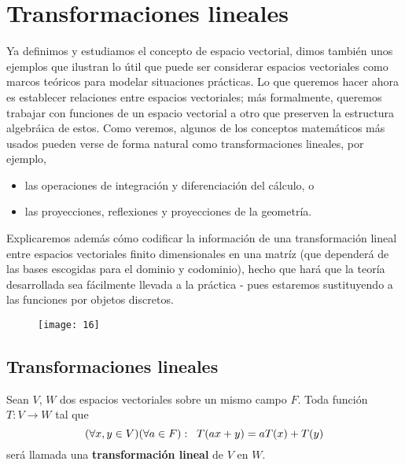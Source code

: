 \chapter{Transformaciones lineales}

Ya definimos y estudiamos el concepto de espacio vectorial, dimos
también unos ejemplos que ilustran lo útil que puede ser considerar
espacios vectoriales como marcos teóricos para modelar situaciones
prácticas. Lo que queremos hacer ahora es establecer relaciones entre
espacios vectoriales; más formalmente, queremos 
trabajar con funciones de un espacio vectorial a otro
que preserven la estructura algebráica de estos. Como veremos,
algunos de los conceptos matemáticos más usados pueden
verse de forma natural como transformaciones lineales, por ejemplo,
\begin{itemize}
	\item las operaciones de integración y diferenciación
	del cálculo, o 
	\item las proyecciones, reflexiones y proyecciones de
	la geometría.
\end{itemize}


Explicaremos además cómo codificar la información de una
transformación lineal 
entre espacios vectoriales finito
dimensionales en una matríz (que dependerá de las bases
escogidas para el dominio y codominio), hecho que hará que la teoría
desarrollada sea fácilmente llevada a la práctica - pues estaremos
sustituyendo a las funciones por objetos discretos.

\begin{figure}[H]
	\centering
	\texttt{[image: 16]} 
\end{figure}	

\section{Transformaciones lineales}

\begin{defi}
Sean $V$, $W$ dos espacios vectoriales sobre un mismo campo $F$.
Toda función $T: V \longrightarrow W$ tal que
\begin{equation}
	\label{eq: condicion linealidad}
(\forall x, y \in V) (\forall a \in F): \hspace{0.2cm}
T(ax + y) = a T(x) + T(y)
\end{equation}
será llamada una \textbf{transformación lineal} de $V$ en $W$.
\end{defi}


